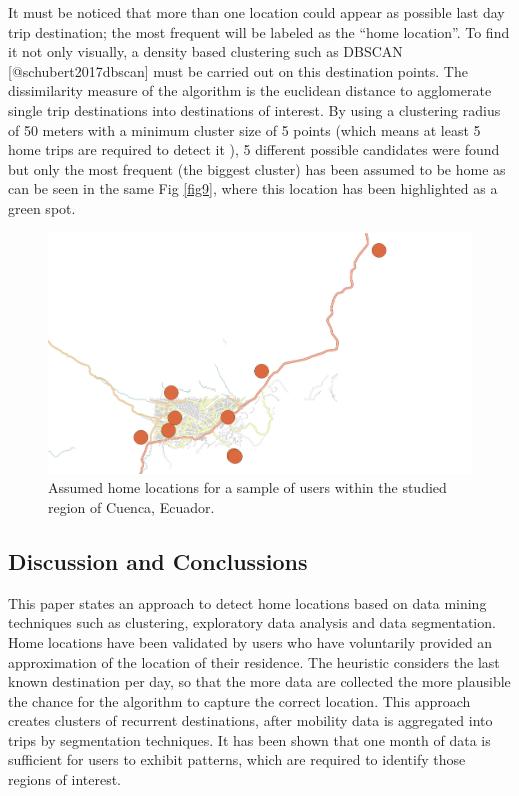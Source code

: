 \documentclass[runningheads]{llncs}
\begin{document}
It must be noticed that more than one location could appear as possible last day trip destination; the most frequent will be labeled as the ``home location''. To find it not only visually, a density based clustering such as DBSCAN {[}@schubert2017dbscan{]} must be carried out on this destination points. The dissimilarity measure of the algorithm is the euclidean distance to agglomerate single trip destinations into destinations of interest. By using a clustering radius of 50 meters with a minimum cluster size of 5 points (which means at least 5 home trips are required to detect it ), 5 different possible candidates were found but only the most frequent (the biggest cluster) has been assumed to be home as can be seen in the same Fig \ref{fig9}, where this location has been highlighted as a green spot.

\begin{figure}

{\centering \includegraphics[width=0.9\linewidth]{paper/images/allhomes} 

}

\caption{\label{fig10}Assumed home locations for a sample of users within the studied region of Cuenca, Ecuador.}\label{fig:unnamed-chunk-8}
\end{figure}

\hypertarget{discussion-and-conclussions}{%
\subsection{Discussion and Conclussions}\label{discussion-and-conclussions}}

This paper states an approach to detect home locations based on data mining techniques such as clustering, exploratory data analysis and data segmentation. Home locations have been validated by users who have voluntarily provided an approximation of the location of their residence. The heuristic considers the last known destination per day, so that the more data are collected the more plausible the chance for the algorithm to capture the correct location. This approach creates clusters of recurrent destinations, after mobility data is aggregated into trips by segmentation techniques. It has been shown that one month of data is sufficient for users to exhibit patterns, which are required to identify those regions of interest.
\end{document}
